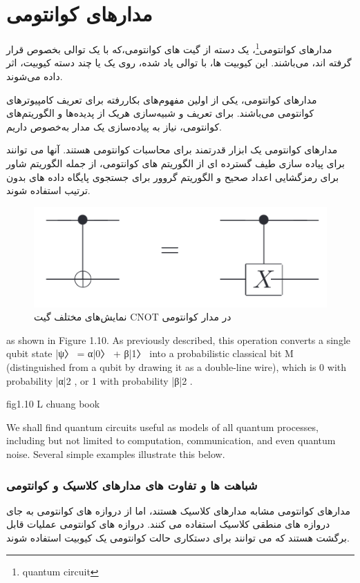 \documentclass{book}
\begin{document}
\section{مدار‌های کوانتومی}
مدار‌های ‌کوانتومی\footnote{quantum circuit}، یک دسته از گیت ها‌ی کوانتومی،که با یک توالی بخصوص قرار گرفته اند، ‌می‌باشند. این کیوبیت ها، با توالی یاد شده، روی یک یا چند دسته کیوبیت، اثر داده ‌می‌شوند. 

مدار‌های کوانتومی، یکی از اولین مفهوم‌های بکار‌رفته برای تعریف کامپیوتر‌های کوانتومی‌ می‌باشند. برای تعریف و شبیه‌سازی هریک از پدیده‌ها و الگوریتم‌های کوانتومی، نیاز به پیاده‌سازی یک مدار به‌خصوص داریم.


مدارهای کوانتومی یک ابزار قدرتمند برای محاسبات کوانتومی هستند. آنها می توانند برای پیاده سازی طیف گسترده ای از الگوریتم های کوانتومی، از جمله الگوریتم شاور برای رمزگشایی اعداد صحیح و الگوریتم گروور برای جستجوی پایگاه داده های بدون ترتیب استفاده شوند.


\begin{figure}[htbp]
	\centering
	\includegraphics[width=\linewidth]{cnot in circuit.png}
	\caption{نمایش‌های مختلف گیت CNOT در مدار کوانتومی}
	\label{fig:my_image}
\end{figure}


as shown in Figure 1.10. As previously described, this operation converts a single qubit
state |ψ〉 = α|0〉 + β|1〉 into a probabilistic classical bit M (distinguished from a qubit by
drawing it as a double-line wire), which is 0 with probability |α|2 , or 1 with probability
|β|2 .


fig1.10 L chuang book

We shall find quantum circuits useful as models of all quantum processes, including
but not limited to computation, communication, and even quantum noise. Several simple
examples illustrate this below.
\subsubsection{شباهت ها و تفاوت های مدارهای کلاسیک و کوانتومی}
مدارهای کوانتومی مشابه مدارهای کلاسیک هستند، اما از دروازه های کوانتومی به جای دروازه های منطقی کلاسیک استفاده می کنند. دروازه های کوانتومی عملیات قابل برگشت هستند که می توانند برای دستکاری حالت کوانتومی یک کیوبیت استفاده شوند.
\end{document}
